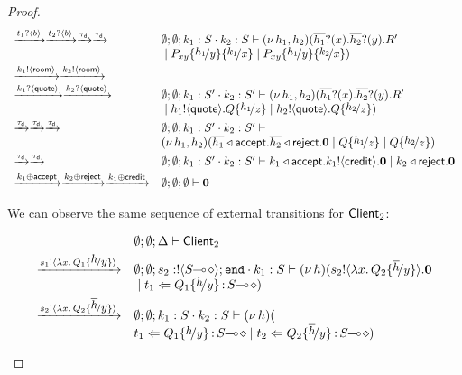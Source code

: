 \begin{proof}
\[\begin{array}{ll}
		\by{\bactinp{t_1}{b}} \by{\bactinp{t_2}{b}} \by{\dtau}\by{\dtau}&
		\es; \es; k_1: S \cat k_2: S \proves \newsp{h_1, h_2}{
		\binp{\dual{h_1}}{x} \binp{\dual{h_2}}{y} R'\\
		& \Par P_{xy}\subst{h_1}{y} \subst{k_1}{x} \Par P_{xy}\subst{h_1}{y} \subst{k_2}{x}}
		\\[1mm]

		\by{\bactout{k_1}{\rtype}} \by{\bactout{k_2}{\rtype}}\\
		\by{\bactinp{k_1}{\Quote}} \by{\bactinp{k_2}{\Quote}}
		& \es; \es; k_1: S' \cat k_2: S' \proves \newsp{h_1, h_2}{
		\binp{\dual{h_1}}{x} \binp{\dual{h_2}}{y} R'\\
		& \Par \bout{h_1}{\Quote} Q \subst{h_1}{z} \Par \bout{h_2}{\Quote} Q \subst{h_2}{z}}
		\\[1mm]

		\by{\dtau} \by{\dtau} \by{\dtau}&
		\es; \es; k_1: S' \cat k_2: S' \proves \\
		& \newsp{h_1, h_2}{\bsel{\dual{h_1}}{\accept} \bsel{\dual{h_2}}{\reject} \inact
		\Par Q \subst{h_1}{z} \Par Q \subst{h_2}{z}}
		\\[1mm]

		\by{\dtau} \by{\dtau}&
		\es; \es; k_1: S' \cat k_2: S' \proves
		\bsel{k_1}{\accept} \bout{k_1}{\creditc} \inact 
		\Par \bsel{k_2}{\reject} \inact
		\\[1mm]

		\by{\bactsel{k_1}{\accept}} \by{\bactsel{k_2}{\reject}} \by{\bactsel{k_1}{\creditc}}&
		\es; \es; \es \proves \inact
	\end{array}
\]

\noi	We can observe the same sequence of external transitions for $\mathsf{Client}_2$:

\[
	\begin{array}{ll}
		& \es; \es; \Delta \proves \Client_2
\\[1mm]

		\by{\bactout{s_1}{\abs{x}{Q_1 \subst{h}{y}}}}&
		\es; \es; s_2: \btout{\lhot{S}} \tinact \cat k_1: S \proves \newsp{h}{\bout{s_2}{\abs{x}{Q_2 \subst{\dual{h}}{y}}} \inact\\
		& \Par \ftrigger{t_1}{Q_1 \subst{h}{y}}{\lhot{S}}}
\\[1mm]

		\by{\bactout{s_2}{\abs{x}{Q_2 \subst{\dual{h}}{y}}}}&
		\es; \es; k_1: S \cat k_2: S \proves \newsp{h}{\\
		& \ftrigger{t_1}{Q_1 \subst{h}{y}}{\lhot{S}} \Par \ftrigger{t_2}{Q_2 \subst{\dual{h}}{y}}{\lhot{S}}}
\\[1mm]


\end{array}\]
\end{proof}
